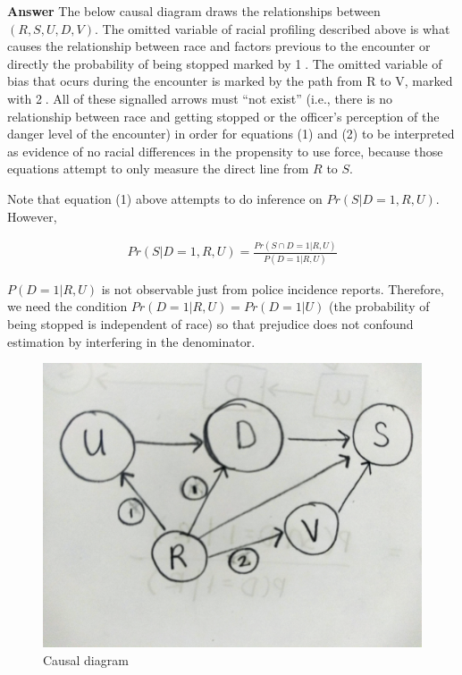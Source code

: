 \documentclass[11pt]{exam}
\begin{document}
\begin{questions}
\textbf{Answer} The below causal diagram draws the relationships between
\((R, S, U, D, V)\). The omitted variable of racial profiling described
above is what causes the relationship between race and factors previous
to the encounter or directly the probability of being stopped marked by
\textcircled{1}. The omitted variable of bias that ocurs during the encounter is
marked by the path from R to V, marked with \textcircled{2}. All of these signalled
arrows must ``not exist'' (i.e., there is no relationship between race
and getting stopped or the officer's perception of the danger level of
the encounter) in order for equations (1) and (2) to be interpreted as
evidence of no racial differences in the propensity to use force,
because those equations attempt to only measure the direct line from
\(R\) to \(S\).

Note that equation (1) above attempts to do inference on
\(Pr(S|D=1,R,U)\). However,

\begin{align*}Pr(S|D=1,R,U) = \frac{Pr(S\cap D = 1|R, U)}{P(D=1|R, U)}
\end{align*}

\(P(D=1|R, U)\) is not observable just from police incidence
reports. Therefore, we need the condition
\(Pr(D = 1|R,U) = Pr(D = 1 | U)\) (the probability of being stopped is
independent of race) so that prejudice does not confound estimation by
interfering in the denominator.

    \begin{figure}
\centering
\includegraphics{causal_diagram.png}
\caption{Causal diagram}
\end{figure}


\end{questions}
\end{document}
